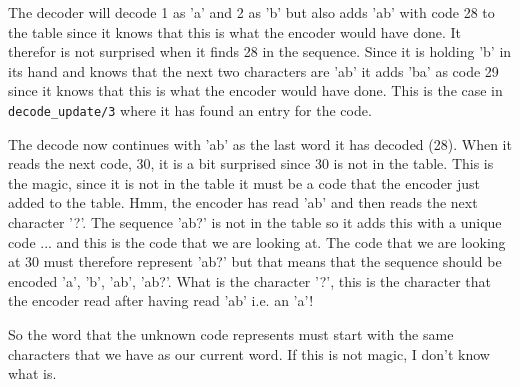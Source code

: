 \documentclass[a4paper,11pt]{article}
\begin{document}
The decoder will decode 1 as 'a' and 2 as 'b' but also adds 'ab' with
code 28 to the table since it knows that this is what the encoder
would have done.  It therefor is not surprised when it finds 28 in the
sequence. Since it is holding 'b' in its hand and knows that the next
two characters are 'ab' it adds 'ba' as code 29 since it knows that
this is what the encoder would have done. This is the case in {\tt
  decode\_update/3} where it has found an entry for the code.

The decode now continues with 'ab' as the last word it has decoded
(28). When it reads the next code, 30, it is a bit surprised since 30
is not in the table. This is the magic, since it is not in the table
it must be a code that the encoder just added to the table. Hmm, the
encoder has read 'ab' and then reads the next character '?'. The
sequence 'ab?' is not in the table so it adds this with a unique code
... and this is the code that we are looking at. The code that we are
looking at 30 must therefore represent 'ab?' but that means that the
sequence should be encoded 'a', 'b', 'ab', 'ab?'. What is the
character '?', this is the character that the encoder read after
having read 'ab' i.e. an 'a'!

So the word that the unknown code represents must start with the
same characters that we have as our current word. If this is not magic,
I don't know what is.
\end{document}
